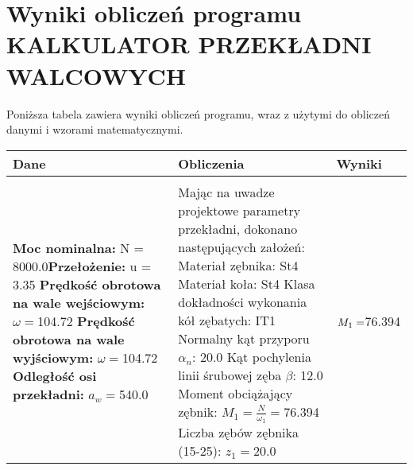 \documentclass{article}%
\begin{document}
%
\normalsize%
\section{Wyniki obliczeń programu KALKULATOR PRZEKŁADNI WALCOWYCH}%
\label{sec:WynikiobliczeprogramuKALKULATORPRZEKADNIWALCOWYCH}%
Poniższa tabela zawiera wyniki obliczeń programu, wraz z użytymi do obliczeń danymi i wzorami matematycznymi. \newline%
 \newline%
%
\begin{longtable}{|p{3cm}|p{7cm}|p{3cm}|}%
\hline%
\textbf{Dane}&\textbf{Obliczenia}&\textbf{Wyniki}\\%
\hline%
&&\\%
\textbf{Moc nominalna:} \newline N = 8000.0\newline \textbf{Przełożenie:} \newline u = 3.35 \newline \textbf{Prędkość obrotowa na wale wejściowym:} \newline $\omega = $104.72 \newline \textbf{Prędkość obrotowa na wale wyjściowym:} \newline $\omega = $104.72 \newline \textbf{Odległość osi przekładni:} \newline $a_w = $540.0&Mając na uwadze projektowe parametry przekładni, dokonano następujących założeń: \newline  \newline Materiał zębnika: St4 \newline Materiał koła: St4 \newline Klasa dokładności wykonania kół zębatych: IT1 \newline Normalny kąt przyporu $\alpha_n$: 20.0 \newline Kąt pochylenia linii śrubowej zęba $\beta$: 12.0 \newline Moment obciążający zębnik: \newline  \newline $M_1 = \frac{N}{\omega_1} = $76.394 \newline \newline Liczba zębów zębnika (15-25): $z_1 = $20.0&$ \newline \newline \newline \newline \newline \newline \newline \newline \newline \newline \newline M_1 = $76.394\\%

\end{longtable}
\end{document}
